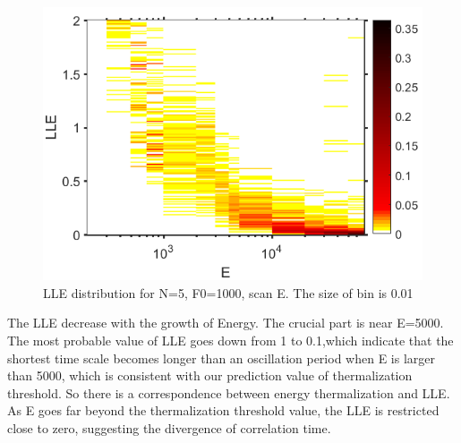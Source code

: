 \documentclass[aps,preprintnumbers,onecolumn,amsmath,amssymb,floatfix,pra]{revtex4-1}
\begin{document}
\begin{figure}[h]
\centering
\includegraphics[scale=0.4]{ZhiyuPictures/LLEdistribution_1_11_pre_hot2_screenshot.png}
\caption{LLE distribution for N=5, F0=1000, scan E. The size of bin is 0.01}\label{fig:LLEdistribution1}
\end{figure}



The LLE decrease with the growth of Energy. The crucial part is near E=5000. The most probable value of LLE goes down from 1 to 0.1,which indicate that the shortest time scale becomes longer than an oscillation period when E is larger than 5000, which is consistent with our prediction value of thermalization threshold. So there is a correspondence between energy thermalization and LLE. As E goes far beyond the thermalization threshold value, the LLE is restricted close to zero, suggesting the divergence of correlation time.
\end{document}
